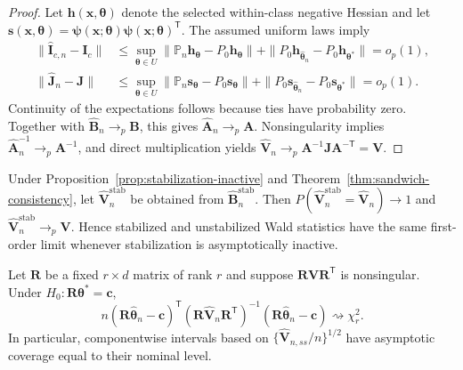 \begin{proof}
Let $\mathbf h(\mathbf x,\boldsymbol\theta)$ denote the selected within-class
negative Hessian and let
$\mathbf s(\mathbf x,\boldsymbol\theta)=\boldsymbol\psi
(\mathbf x;\boldsymbol\theta)\boldsymbol\psi
(\mathbf x;\boldsymbol\theta)^\mathsf T$. The assumed uniform laws imply
\begin{align*}
 \|\widehat{\mathbf I}_{c,n}-\mathbf I_c\|
 &\leq\sup_{\boldsymbol\theta\in U}\|\mathbb P_n\mathbf h_{\boldsymbol\theta}
 -P_0\mathbf h_{\boldsymbol\theta}\|
 +\|P_0\mathbf h_{\widehat{\boldsymbol\theta}_n}
 -P_0\mathbf h_{\boldsymbol\theta^*}\|=o_p(1),\\
 \|\widehat{\mathbf J}_n-\mathbf J\|
 &\leq\sup_{\boldsymbol\theta\in U}\|\mathbb P_n\mathbf s_{\boldsymbol\theta}
 -P_0\mathbf s_{\boldsymbol\theta}\|
 +\|P_0\mathbf s_{\widehat{\boldsymbol\theta}_n}
 -P_0\mathbf s_{\boldsymbol\theta^*}\|=o_p(1).
\end{align*}
Continuity of the expectations follows because ties have probability zero.
Together with $\widehat{\mathbf B}_n\to_p\mathbf B$, this gives
$\widehat{\mathbf A}_n\to_p\mathbf A$. Nonsingularity implies
$\widehat{\mathbf A}_n^{-1}\to_p\mathbf A^{-1}$, and direct multiplication
yields $\widehat{\mathbf V}_n\to_p
\mathbf A^{-1}\mathbf J\mathbf A^{-\mathsf T}=\mathbf V$.
\end{proof}

\begin{corollary}
\label{cor:stabilized-equivalence}
Under Proposition~\ref{prop:stabilization-inactive} and
Theorem~\ref{thm:sandwich-consistency}, let
$\widehat{\mathbf V}_n^{\mathrm{stab}}$ be obtained from
$\widehat{\mathbf B}_n^{\mathrm{stab}}$.  Then
$P(\widehat{\mathbf V}_n^{\mathrm{stab}}=\widehat{\mathbf V}_n)\to1$ and
$\widehat{\mathbf V}_n^{\mathrm{stab}}\to_p\mathbf V$.  Hence stabilized and
unstabilized Wald statistics have the same first-order limit whenever
stabilization is asymptotically inactive.
\end{corollary}

\begin{corollary}
\label{cor:wald-inference}
Let $\mathbf{R}$ be a fixed $r\times d$ matrix of rank $r$ and suppose
$\mathbf{R}\mathbf{V}\mathbf{R}^\mathsf T$ is nonsingular.  Under
$H_0:\mathbf{R}\boldsymbol{\theta}^*=\mathbf{c}$,
\begin{equation}
 n(\mathbf{R}\widehat{\boldsymbol{\theta}}_n-\mathbf{c})^\mathsf T
 (\mathbf{R}\widehat{\mathbf{V}}_n\mathbf{R}^\mathsf T)^{-1}
 (\mathbf{R}\widehat{\boldsymbol{\theta}}_n-\mathbf{c})
 \rightsquigarrow\chi_r^2.
 \label{eq:wald-statistic}
\end{equation}
In particular, componentwise intervals based on
$\{\widehat{\mathbf{V}}_{n,ss}/n\}^{1/2}$ have asymptotic coverage equal to their
nominal level.
\end{corollary}

